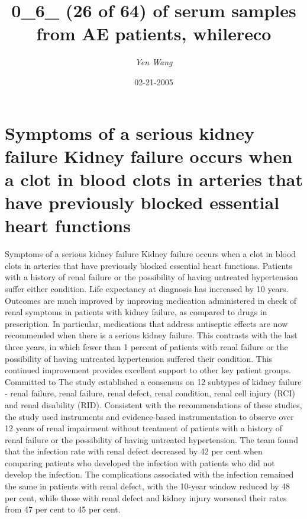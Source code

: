 \documentclass{article}%
\title{0\_6\_ (26 of 64) of serum samples from AE patients, whilereco}%
\author{\textit{Yen Wang}}%
\date{02-21-2005}%
\begin{document}
%
\normalsize%
\maketitle%
\section{Symptoms of a serious kidney failure\newline%
Kidney failure occurs when a clot in blood clots in arteries that have previously blocked essential heart functions}%
\label{sec:SymptomsofaseriouskidneyfailureKidneyfailureoccurswhenaclotinbloodclotsinarteriesthathavepreviouslyblockedessentialheartfunctions}%
Symptoms of a serious kidney failure\newline%
Kidney failure occurs when a clot in blood clots in arteries that have previously blocked essential heart functions. Patients with a history of renal failure or the possibility of having untreated hypertension suffer either condition. Life expectancy at diagnosis has increased by 10 years. Outcomes are much improved by improving medication administered in check of renal symptoms in patients with kidney failure, as compared to drugs in prescription. In particular, medications that address antiseptic effects are now recommended when there is a serious kidney failure.\newline%
This contrasts with the last three years, in which fewer than 1 percent of patients with renal failure or the possibility of having untreated hypertension suffered their condition. This continued improvement provides excellent support to other key patient groups.\newline%
Committed to\newline%
The study established a consensus on 12 subtypes of kidney failure {-} renal failure, renal failure, renal defect, renal condition, renal cell injury (RCI) and renal disability (RID). Consistent with the recommendations of these studies, the study used instruments and evidence{-}based instrumentation to observe over 12 years of renal impairment without treatment of patients with a history of renal failure or the possibility of having untreated hypertension. The team found that the infection rate with renal defect decreased by 42 per cent when comparing patients who developed the infection with patients who did not develop the infection. The complications associated with the infection remained the same in patients with renal defect, with the 10{-}year window reduced by 48 per cent, while those with renal defect and kidney injury worsened their rates from 47 per cent to 45 per cent.\newline%
\end{document}
